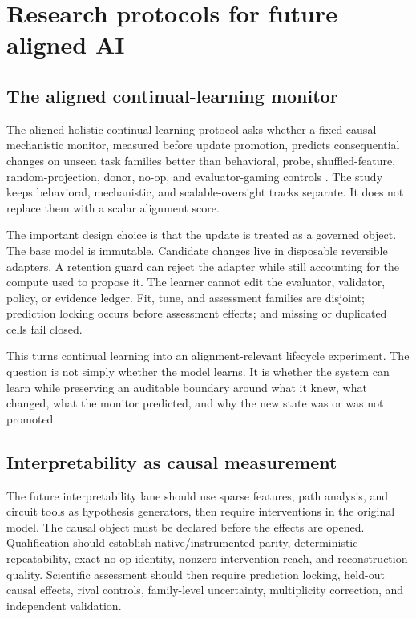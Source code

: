 \documentclass[11pt,twoside]{article}
\newcommand{\sourcecite}[1]{\parencite{#1}}
\begin{document}
\section{Research protocols for future aligned AI}

\subsection{The aligned continual-learning monitor}

  The aligned holistic continual-learning protocol asks whether a fixed causal mechanistic monitor, measured before update promotion, predicts consequential changes on unseen task families better than behavioral, probe, shuffled-feature, random-projection, donor, no-op, and evaluator-gaming controls \sourcecite{repoAHCL2026}. The study keeps behavioral, mechanistic, and scalable-oversight tracks separate. It does not replace them with a scalar alignment score.

  The important design choice is that the update is treated as a governed object. The base model is immutable. Candidate changes live in disposable reversible adapters. A retention guard can reject the adapter while still accounting for the compute used to propose it. The learner cannot edit the evaluator, validator, policy, or evidence ledger. Fit, tune, and assessment families are disjoint; prediction locking occurs before assessment effects; and missing or duplicated cells fail closed.

  This turns continual learning into an alignment-relevant lifecycle experiment. The question is not simply whether the model learns. It is whether the system can learn while preserving an auditable boundary around what it knew, what changed, what the monitor predicted, and why the new state was or was not promoted.

\subsection{Interpretability as causal measurement}

  The future interpretability lane should use sparse features, path analysis, and circuit tools as hypothesis generators, then require interventions in the original model. The causal object must be declared before the effects are opened. Qualification should establish native/instrumented parity, deterministic repeatability, exact no-op identity, nonzero intervention reach, and reconstruction quality. Scientific assessment should then require prediction locking, held-out causal effects, rival controls, family-level uncertainty, multiplicity correction, and independent validation.
\end{document}
